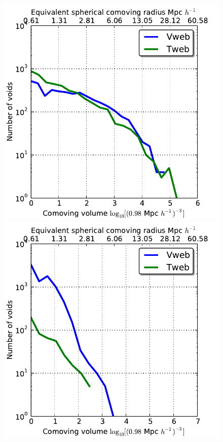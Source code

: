 \documentclass[a4,useAMS,usenatbib,usegraphicx]{latex/mn2e}
\begin{document}
\begin{flushleft}
\begin{figure}
\centering

  \includegraphics[trim = 0mm 0mm 5mm 0mm, clip, keepaspectratio=true,
  width=0.24\textheight]{./figures/voids_regions_volume_FOF_null.pdf}
  \includegraphics[trim = 0mm 0mm 5mm 0mm, clip, keepaspectratio=true,
  width=0.24\textheight]{./figures/voids_regions_volume_FOF_opt.pdf}


\end{figure}
\end{flushleft}
\end{document}
